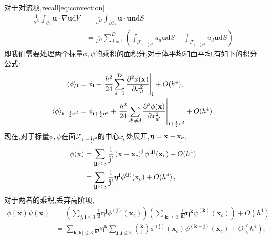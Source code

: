 \documentclass[12pt,halfline,a4paper]{ouparticle}
\begin{document}
对于对流项,recall\eqref{eq:convection}
\begin{equation}
\begin{aligned}
\frac{1}{h^D}\int_{\mathcal{C}_i}\boldsymbol{u} \cdot \nabla \boldsymbol{u} \text{d} V
&= \frac{1}{h^D}\int_{\partial \mathcal{C}_i} \boldsymbol{u} \cdot \boldsymbol{u} \mathbf{n} \text{d} S\\
&= \frac{1}{h^D}\sum_{d=1}^D (\int_{\mathcal{F}_{i+\frac12 e^d}}  u_d\boldsymbol{u}\text{d} S-\int_{\mathcal{F}_{i-\frac12 e^d}}  u_d\boldsymbol{u}\text{d} S)
\end{aligned}
\end{equation}
即我们需要处理两个标量$\phi,\psi$的乘积的面积分,对于体平均和面平均,有如下的积分公式:
\begin{align}
\langle\phi\rangle_{\bf i}&=\phi_{\bf i}+\left. \frac{h^{2}} {2 4} \sum_{d=1}^{\bf D} \frac{\partial^{2} \phi( {\bf x} )} {\partial x_{d}^{2}} \right|_{\bf i}+O ( h^{4} ),\\
\langle\phi\rangle_{{\bf i}+\frac{1} {2} {\bf e}^{d}}&=\phi_{{\bf i}+\frac{1} {2} {\bf e}^{d}}+\left. \frac{h^{2}} {2 4} \sum_{d^{\prime} \neq d} \frac{\partial^{2} \phi( {\bf x} )} {\partial x_{d^{\prime}}^{2}} \right|_{{\bf i}+\frac{1} {2} {\bf e}^{d}}+O ( h^{4} ). 
\end{align}
现在,对于标量$\phi,\psi$在面$\mathcal{F}_{i+\frac12 e^d}$的中心$x_c$处展开,$\boldsymbol{\eta} = \bf x-\bf x_c$,
\begin{equation*}
   \begin{aligned}
{{\phi( {\bf x} )}} & {{} {{}=\sum_{| {\bf j} | \leq3} \frac{1} {{\bf j}!} \left( {\bf x}-{\bf x}_{c} \right)^{\bf j} \phi^{( {\bf j} )} ( {\bf x}_{c} )+O ( h^{4} )}} \\ {{}} & {{} {{}=\sum_{| {\bf j} | \leq3} \frac{1} {{\bf j}!} \boldsymbol{\eta}^{\bf j} \phi^{( {\bf j} )} ( {\bf x}_{c} )+O ( h^{4} ) \,,}} \\ 
    \end{aligned}
\end{equation*}
对于两者的乘积,丢弃高阶项,
\begin{equation*}
    \begin{aligned} {{\phi( \mathbf{x} ) \psi( \mathbf{x} )}} & {{} {{}=\left( \sum_{j, \mathbf{i} \leq3} \frac{1} {\mathbf{i}!} \boldsymbol{\eta}^{\mathbf{j}} \phi^{( \mathbf{j} )} ( \mathbf{x}_{c} ) \right) \left( \sum_{| \mathbf{k} | \leq3} \frac{1} {\mathbf{k}!} \boldsymbol{\eta}^{\mathbf{k}} \psi^{( \mathbf{k} )} ( \mathbf{x}_{c} ) \right)}} +O ( h^{4} )\\ 
        {{}} & {{} {{} {}=\sum_{\mathbf{k}, \mathbf{k} | \leq3} \frac{1} {\mathbf{k}!} \boldsymbol{\eta}^{\mathbf{k}} \sum_{\mathbf{j}, \mathbf{j} \leq\mathbf{k}} \binom{\mathbf{k}} {\mathbf{j}} \phi^{( \mathbf{j} )} ( \mathbf{x}_{c} ) \psi^{( \mathbf{k}-\mathbf{j} )} ( \mathbf{x}_{c} )}} +O ( h^{4} ), \\ \end{aligned} 
\end{equation*}
\end{document}
